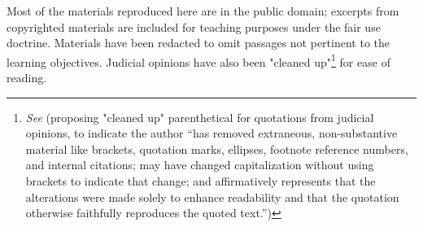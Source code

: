 Most of the materials reproduced here are in the public domain; excerpts from copyrighted materials are included for teaching purposes under the fair use doctrine. Materials have been redacted to omit passages not pertinent to the learning objectives. Judicial opinions have also been "cleaned up"\footnote{\textit{See} \cite{Metzler2017} (proposing "cleaned up" parenthetical for quotations from judicial opinions, to indicate the author “has removed extraneous, non-substantive material like brackets, quotation marks, ellipses, footnote reference numbers, and internal citations; may have changed capitalization without using brackets to indicate that change; and affirmatively represents that the alterations were made solely to enhance readability and that the quotation otherwise faithfully reproduces the quoted text.”)} for ease of reading. 